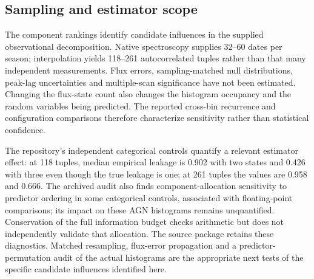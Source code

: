 \documentclass[fleqn,usenatbib]{mnras}
\begin{document}
\subsection{Sampling and estimator scope}
\label{sec:limits}
The component rankings identify candidate influences in the supplied observational decomposition. Native spectroscopy supplies 32--60 dates per season; interpolation yields 118--261 autocorrelated tuples rather than that many independent measurements. Flux errors, sampling-matched null distributions, peak-lag uncertainties and multiple-scan significance have not been estimated. Changing the flux-state count also changes the histogram occupancy and the random variables being predicted. The reported cross-bin recurrence and configuration comparisons therefore characterize sensitivity rather than statistical confidence.

The repository's independent categorical controls quantify a relevant estimator effect: at 118 tuples, median empirical leakage is 0.902 with two states and 0.426 with three even though the true leakage is one; at 261 tuples the values are 0.958 and 0.666. The archived audit also finds component-allocation sensitivity to predictor ordering in some categorical controls, associated with floating-point comparisons; its impact on these AGN histograms remains unquantified. Conservation of the full information budget checks arithmetic but does not independently validate that allocation. The source package retains these diagnostics. Matched resampling, flux-error propagation and a predictor-permutation audit of the actual histograms are the appropriate next tests of the specific candidate influences identified here.
\end{document}
